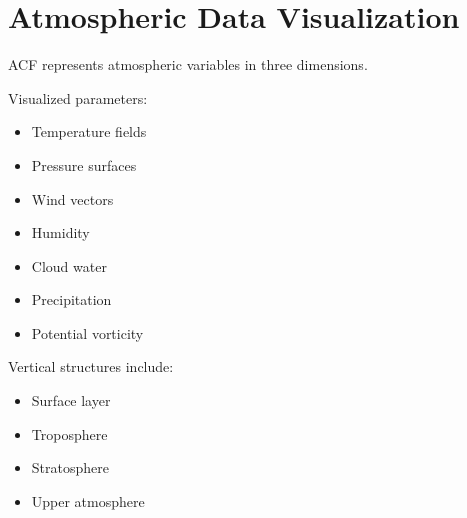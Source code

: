 \section{Atmospheric Data Visualization}


ACF represents atmospheric variables in three dimensions.



Visualized parameters:


\begin{itemize}

\item Temperature fields

\item Pressure surfaces

\item Wind vectors

\item Humidity

\item Cloud water

\item Precipitation

\item Potential vorticity

\end{itemize}



Vertical structures include:


\begin{itemize}

\item Surface layer

\item Troposphere

\item Stratosphere

\item Upper atmosphere

\end{itemize}
